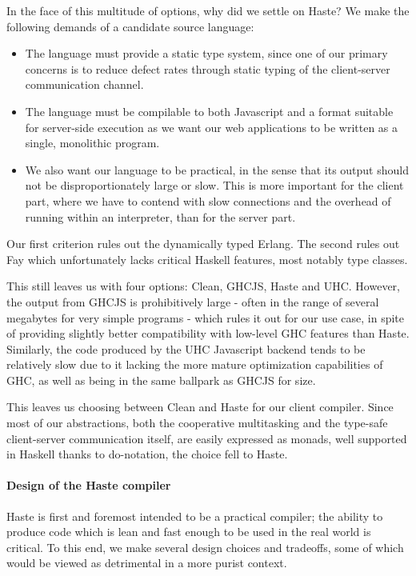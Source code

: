 \documentclass[preprint]{sigplanconf}
\begin{document}
In the face of this multitude of options, why did we settle on Haste? We make
the following demands of a candidate source language:

\begin{itemize}
  \item The language must provide a static type system, since one of our
        primary concerns is to reduce defect rates through static typing of
        the client-server communication channel.
  \item The language must be compilable to both Javascript and a format
        suitable for server-side execution as we want our web applications
        to be written as a single, monolithic program.
  \item We also want our language to be practical, in the sense that its output
        should not be disproportionately large or slow. This is more important
        for the client part, where we have to contend with slow connections and
        the overhead of running within an interpreter, than for the server part.
\end{itemize}

Our first criterion rules out the dynamically typed Erlang. The second rules
out Fay which unfortunately lacks critical Haskell features, most notably type
classes.

This still leaves us with four options: Clean, GHCJS, Haste and UHC. However,
the output from GHCJS is prohibitively large - often in the range of several
megabytes for very simple programs - which rules it out for our use case, in
spite of providing slightly better compatibility with low-level GHC features
than Haste. Similarly, the code produced by the UHC Javascript backend tends to
be relatively slow due to it lacking the more mature optimization capabilities
of GHC, as well as being in the same ballpark as GHCJS for size.\ \cite{haste}

This leaves us choosing between Clean and Haste for our client compiler. Since
most of our abstractions, both the cooperative multitasking and the type-safe
client-server communication itself, are easily expressed as monads, well
supported in Haskell thanks to do-notation, the choice fell to Haste.

\paragraph{Design of the Haste compiler} Haste is first and foremost intended
to be a practical compiler; the ability to produce code which is lean and fast
enough to be used in the real world is critical. To this end, we make several
design choices and tradeoffs, some of which would be viewed as detrimental in a
more purist context.
\end{document}

